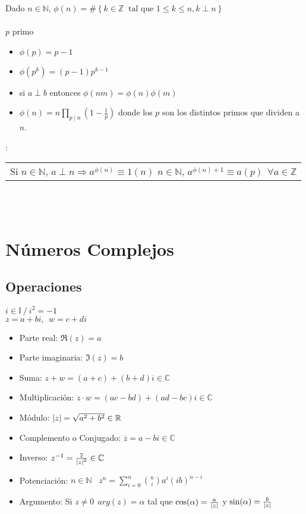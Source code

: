 \documentclass[a4paper,10pt]{article}
\begin{document}
 Dado $n \in \mathbb{N}$, $\phi (n) = \# \left\lbrace k \in \mathbb{Z} \ \mbox{ tal que } 1 \leq k \leq n, k \perp n \right\rbrace$ \\ \\


\propiedades $p$ primo
\begin{itemize}
	\item $\phi(p) = p-1$
	\item $\phi(p^{k}) = (p-1)p^{k-1}$
	\item si $a \perp b$ entonces $\phi(nm) = \phi(n)\phi(m)$
	\item $\displaystyle \phi(n) = n \prod_{p \mid n} { \left(1 - \frac{1}{p}\right)}$ donde los $p$ son los distintos primos que dividen a $n$.
\end{itemize} 

: 
\begin{tabular}{l}
	Si $n \in \mathbb{N}$, $a \perp n \Rightarrow a^{\phi(n)} \equiv 1 (n)$
	\cr $n \in \mathbb{N}$, $a^{\phi(n)+1} \equiv a (p) \ \ \forall a \in \mathbb{Z}$
\end{tabular} \\ \\


\section{Números Complejos}


\subsection{Operaciones}


 $i \in \mathbb{I} \ / \ i^{2}=-1$ \\

 $z=a+bi, \ \ w=c+di$
\begin{itemize}
	\item Parte real: $\Re(z) = a$
	\item Parte imaginaria: $\Im(z) = b$
	\item Suma: $z+w=(a+c)+(b+d)i \in \mathbb{C}$
	\item Multiplicación: $z \cdot w = (ac - bd) + (ad - bc)i \in \mathbb{C}$
	\item Módulo: $\left\lvert z\right\rvert=\sqrt{a^{2}+b^{2}} \in \mathbb{R}$
	\item Complemento o Conjugado: $\overline{z} = a-bi \in \mathbb{C}$
	\item Inverso: $z^{-1} = \frac{\overline{z}}{{\left\lvert z\right\rvert}^{2}} \in \mathbb{C}$
	\item Potenciación: $n \in \mathbb{N}$ \ $z^{n} = \displaystyle \sum_{i = 0}^{n} {\binom{n}{i} {a}^{i} {(ib)}^{n-i}}$
	\item Argumento: Si $z \neq 0 \ \ arg(z) = \alpha$ tal que $\cos(\alpha)=\frac {a}{\left\lvert z\right\rvert}$ y $\sin(\alpha)=\frac {b}{\left\lvert z\right\rvert}$ 
\end{itemize}
\end{document}
